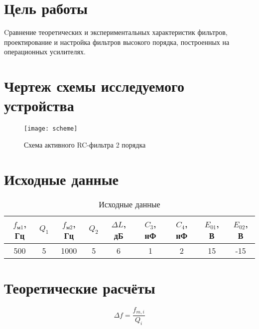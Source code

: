 





\section{Цель работы}

Cравнение теоретических и экспериментальных характеристик фильтров,
проектирование и настройка фильтров высокого порядка, построенных на
операционных усилителях. 

\section{Чертеж схемы исследуемого устройства}

\begin{figure}[H]
\begin{center}
	\texttt{[image: scheme]}
	\caption{Схема активного RC-фильтра 2 порядка}
\end{center}
\end{figure}

\section{Исходные данные}

\begin{table}[H]
\begin{center}
	\caption{Исходные данные}
	\def\tabcolsep{8pt}
	\begin{tabular}{|c|c|c|c|c|c|c|c|c|}
		\hline
		$f_{\text{м1}}$, Гц &
		$Q_1$ &
		$f_{\text{м2}}$, Гц &
		$Q_2$ &
		$\Delta L$, дБ &
		$C_3$, нФ &
		$C_4$, нФ & 
		$E_{01}$, В &
		$E_{02}$, В \\
		\hline
		500 &
		5 &
		1000 &
		5 &
		6 &
		1 &
		2 &
		15 &
		-15 \\
	    \hline	
	\end{tabular}
\end{center}
\end{table}

\section{Теоретические расчёты}

\begin{equation}
	\label{eq:4:1}
	\Delta f = \frac{f_{m, i}}{Q_i}
\end{equation}

